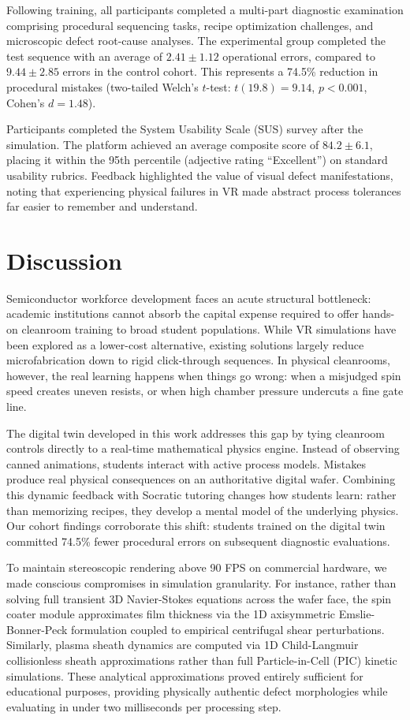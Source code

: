 \documentclass[10pt,a4paper,twocolumn]{article}
\begin{document}
Following training, all participants completed a multi-part diagnostic examination comprising procedural sequencing tasks, recipe optimization challenges, and microscopic defect root-cause analyses. The experimental group completed the test sequence with an average of $2.41 \pm 1.12$ operational errors, compared to $9.44 \pm 2.85$ errors in the control cohort. This represents a 74.5\% reduction in procedural mistakes (two-tailed Welch's $t$-test: $t(19.8) = 9.14$, $p < 0.001$, Cohen's $d = 1.48$). 

Participants completed the System Usability Scale (SUS) survey after the simulation. The platform achieved an average composite score of $84.2 \pm 6.1$, placing it within the 95th percentile (adjective rating ``Excellent'') on standard usability rubrics. Feedback highlighted the value of visual defect manifestations, noting that experiencing physical failures in VR made abstract process tolerances far easier to remember and understand.

\section*{Discussion}
Semiconductor workforce development faces an acute structural bottleneck: academic institutions cannot absorb the capital expense required to offer hands-on cleanroom training to broad student populations. While VR simulations have been explored as a lower-cost alternative, existing solutions largely reduce microfabrication down to rigid click-through sequences. In physical cleanrooms, however, the real learning happens when things go wrong: when a misjudged spin speed creates uneven resists, or when high chamber pressure undercuts a fine gate line.

The digital twin developed in this work addresses this gap by tying cleanroom controls directly to a real-time mathematical physics engine. Instead of observing canned animations, students interact with active process models. Mistakes produce real physical consequences on an authoritative digital wafer. Combining this dynamic feedback with Socratic tutoring changes how students learn: rather than memorizing recipes, they develop a mental model of the underlying physics. Our cohort findings corroborate this shift: students trained on the digital twin committed 74.5\% fewer procedural errors on subsequent diagnostic evaluations.

To maintain stereoscopic rendering above 90 FPS on commercial hardware, we made conscious compromises in simulation granularity. For instance, rather than solving full transient 3D Navier-Stokes equations across the wafer face, the spin coater module approximates film thickness via the 1D axisymmetric Emslie-Bonner-Peck formulation coupled to empirical centrifugal shear perturbations. Similarly, plasma sheath dynamics are computed via 1D Child-Langmuir collisionless sheath approximations rather than full Particle-in-Cell (PIC) kinetic simulations. These analytical approximations proved entirely sufficient for educational purposes, providing physically authentic defect morphologies while evaluating in under two milliseconds per processing step.
\end{document}
